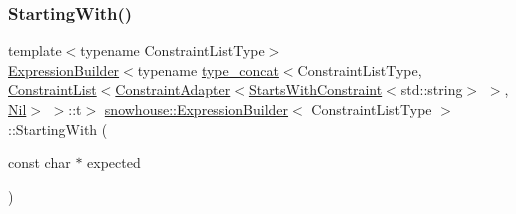 \mbox{\label{structsnowhouse_1_1ExpressionBuilder_ab11b42520d16f32c8ec7a3bbc0ddc302}} 
\subsubsection{\texorpdfstring{StartingWith()}{StartingWith()}\hspace{0.1cm}{\footnotesize\ttfamily [2/2]}}
{\footnotesize\ttfamily template$<$typename Constraint\+List\+Type$>$ \\
\mbox{\hyperlink{structsnowhouse_1_1ExpressionBuilder}{Expression\+Builder}}$<$typename \mbox{\hyperlink{structsnowhouse_1_1type__concat}{type\+\_\+concat}}$<$Constraint\+List\+Type, \mbox{\hyperlink{structsnowhouse_1_1ConstraintList}{Constraint\+List}}$<$\mbox{\hyperlink{structsnowhouse_1_1ConstraintAdapter}{Constraint\+Adapter}}$<$\mbox{\hyperlink{structsnowhouse_1_1StartsWithConstraint}{Starts\+With\+Constraint}}$<$std\+::string$>$ $>$, \mbox{\hyperlink{structsnowhouse_1_1Nil}{Nil}}$>$ $>$\+::t$>$ \mbox{\hyperlink{structsnowhouse_1_1ExpressionBuilder}{snowhouse\+::\+Expression\+Builder}}$<$ Constraint\+List\+Type $>$\+::Starting\+With (\begin{DoxyParamCaption}\item[{const char $\ast$}]{expected }\end{DoxyParamCaption})\hspace{0.3cm}{\ttfamily [inline]}}

\mbox{\label{structsnowhouse_1_1ExpressionBuilder_a6fbd324a200c305ed4fe83aa1143a7ab}} 
